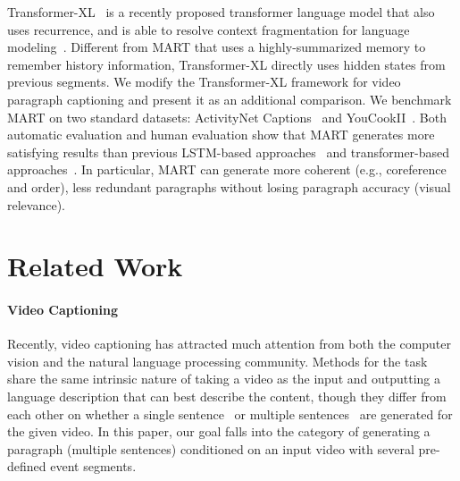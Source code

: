 \documentclass[11pt,a4paper]{article}
\begin{document}
Transformer-XL~\cite{dai2019transformer} is a recently proposed transformer language model that also uses recurrence, and is able to resolve context fragmentation for language modeling~\cite{dai2019transformer}. 
Different from MART that uses a highly-summarized memory to remember history information, Transformer-XL directly uses hidden states from previous segments. 
We modify the Transformer-XL framework for video paragraph captioning and present it as an additional comparison. 
We benchmark MART on two standard datasets: ActivityNet Captions~\cite{krishna2017dense} and YouCookII~\cite{Zhou2017TowardsAL}. 
Both automatic evaluation and human evaluation show that MART generates more satisfying results than previous LSTM-based approaches~\cite{Xiong2018MoveFA, Zhou2018GroundedVD, zhang2018cross} and transformer-based approaches~\cite{zhou2018end, dai2019transformer}.
In particular, MART can generate more coherent (e.g., coreference and order), less redundant paragraphs without losing paragraph accuracy (visual relevance).
 \section{Related Work}\label{related_work}
\paragraph{Video Captioning}
Recently, video captioning has attracted much attention from both the computer vision and the natural language processing community.
Methods for the task share the same intrinsic nature of taking a video as the input and outputting a language description that can best describe the content, though they differ from each other on whether a single sentence~\cite{Wang_2019_ICCV, xu2016msr, chen2011collecting, pasunuru2017multi} or multiple sentences~\cite{rohrbach2014coherent, krishna2017dense, Xiong2018MoveFA, zhou2018end, gella2018dataset, park2019adversarial} are generated for the given video. 
In this paper, our goal falls into the category of generating a paragraph (multiple sentences) conditioned on an input video with several pre-defined event segments.
\end{document}
